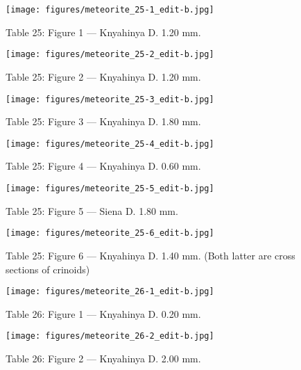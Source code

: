 \documentclass[a4paper, 12pt, oneside]{article}
\begin{document}
\begin{figure}[t]
\texttt{[image: figures/meteorite\_25-1\_edit-b.jpg]}
\caption{Table 25: Figure 1 --- Knyahinya D. 1.20 mm.}
\centering
\end{figure}
\clearpage
\begin{figure}[t]
\texttt{[image: figures/meteorite\_25-2\_edit-b.jpg]}
\caption{Table 25: Figure 2 --- Knyahinya D. 1.20 mm.}
\centering
\end{figure}
\clearpage
\begin{figure}[t]
\texttt{[image: figures/meteorite\_25-3\_edit-b.jpg]}
\caption{Table 25: Figure 3 --- Knyahinya D. 1.80 mm.}
\centering
\end{figure}
\clearpage
\begin{figure}[t]
\texttt{[image: figures/meteorite\_25-4\_edit-b.jpg]}
\caption{Table 25: Figure 4 --- Knyahinya D. 0.60 mm.}
\centering
\end{figure}
\clearpage
\begin{figure}[t]
\texttt{[image: figures/meteorite\_25-5\_edit-b.jpg]}
\caption{Table 25: Figure 5 --- Siena D. 1.80 mm.}
\centering
\end{figure}
\clearpage
\begin{figure}[t]
\texttt{[image: figures/meteorite\_25-6\_edit-b.jpg]}
\caption{Table 25: Figure 6 --- Knyahinya D. 1.40 mm. (Both latter are cross sections of crinoids)}
\centering
\end{figure}
\clearpage
{}
\begin{figure}[t]
\texttt{[image: figures/meteorite\_26-1\_edit-b.jpg]}
\caption{Table 26: Figure 1 --- Knyahinya D. 0.20 mm.}
\centering
\end{figure}
\clearpage
\begin{figure}[t]
\texttt{[image: figures/meteorite\_26-2\_edit-b.jpg]}
\caption{Table 26: Figure 2 --- Knyahinya D. 2.00 mm.}
\centering
\end{figure}
\end{document}
